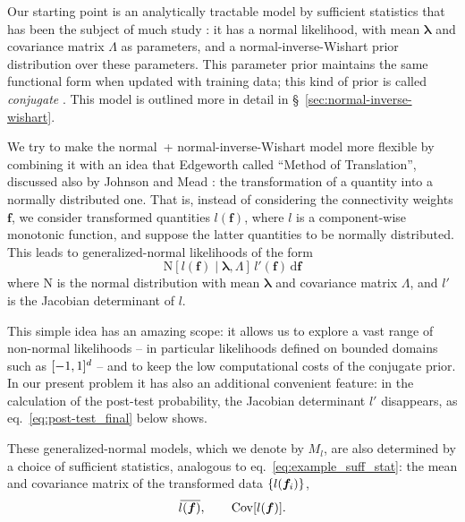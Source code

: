 \documentclass[%
]{frontiersSCNS-nologo} %
\newcommand*{\citey}{\citeyearpar}
\newcommand*{\chap}{ch.} %
\newcommand*{\sect}{\S} %
\newcommand*{\eqn}{eq.}
\newcommand*{\widebar}[1]{{\mkern1.5mu\skew{2}\overline{\mkern-1.5mu#1\mkern-1.5mu}\mkern 1.5mu}}
\newcommand*{\di}{\mathrm{d}}%
\renewcommand*{\|}{\mathpunct{|}}%
\DeclarePairedDelimiter\set{\{}{\}}%
\DeclarePairedDelimiter\clcl{[}{]}
\newcommand*{\yxx}{f}
\newcommand*{\yx}{\bm{\yxx}}
\newcommand*{\ylm}{\lambda}
\newcommand*{\ylmm}{\bm{\ylm}}
\newcommand*{\yls}{\varLambda}
\newcommand*{\ylss}{\bm{\yls}}
\newcommand*{\yd}{d}
\newcommand*{\yM}{M}
\newcommand*{\yMl}{\yM_l}
\newcommand*{\ytr}{l}
\newcommand*{\av}{\widebar}
\DeclareMathOperator{\Cov}{Cov}%
\newcommand*{\dnormal}{\mathrm{N}}
\begin{document}
Our starting point is an analytically tractable model by sufficient
statistics that has been the subject of much study
\citetext{\citealp[\sect~3.6]{gelmanetal1995_r2014};
  \citealp{minka1998_r2001,murphy2007}}: it has a normal likelihood, with
mean $\ylmm$ and covariance matrix $\ylss$ as parameters, and a
normal-inverse-Wishart prior distribution over these parameters. This
parameter prior maintains the same functional form when updated with
training data; this kind of prior is called \emph{conjugate}
\citetext{\citealp[\chap~9]{degroot1970_r2004};
  \citealp{diaconisetal1979b}}. This model is outlined more in detail in
\sect~\ref{sec:normal-inverse-wishart}.

We try to make the normal~+ normal-inverse-Wishart model more flexible by
combining it with an idea that Edgeworth \citey{edgeworth1898} called
\enquote{Method of Translation}, discussed also by Johnson
\citey{johnson1949} and Mead \citey{mead1965}: the transformation of a
quantity into a normally distributed one. That is, instead of considering
the connectivity weights $\yx$, we consider transformed quantities
$\ytr(\yx)$, where $\ytr$ is a component-wise monotonic function, and
suppose the latter quantities to be normally distributed. This leads to
generalized-normal likelihoods of the form
\begin{equation}\label{eq:generalized_normal}
\dnormal[\ytr(\yx) \| \ylmm, \ylss] \,\ytr'(\yx) \,\di\yx
\end{equation}
where $\dnormal$ is the normal distribution with mean $\ylmm$ and covariance
matrix $\ylss$, and $\ytr'$ is the Jacobian determinant of $\ytr$.

This simple idea has an amazing scope: it allows us to explore a vast range
of non-normal likelihoods -- in particular likelihoods defined on bounded
domains such as $\clcl{-1,1}^{\yd}$ -- and to keep the low computational
costs of the conjugate prior. In our present problem it has also an
additional convenient feature: in the calculation of the post-test
probability, the Jacobian determinant $\ytr'$ disappears, as
\eqn~\eqref{eq:post-test_final} below shows.

These generalized-normal models, which we denote by $\yMl$, are also
determined by a choice of sufficient statistics, analogous to
\eqn~\eqref{eq:example_suff_stat}: the mean and covariance matrix of the
transformed data $\set{\ytr(\yx_i)}$,
\begin{equation}
  \label{eq:suff_stat_gen_normal}
  \av{\ytr(\yx)}, 
  \qquad
  \Cov[\ytr(\yx)]. 
\end{equation}
\end{document}
